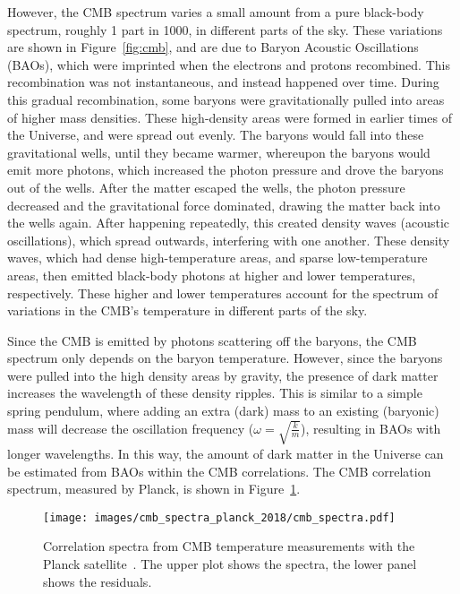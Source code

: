 However, the CMB spectrum varies a small amount from a pure black-body spectrum, roughly 1 part in 1000, in different parts of the sky.
These variations are shown in Figure~\ref{fig:cmb}, and are due to Baryon Acoustic Oscillations (BAOs), which were imprinted when the electrons and protons recombined.
This recombination was not instantaneous, and instead happened over time.
During this gradual recombination, some baryons were gravitationally pulled into areas of higher mass densities.
These high-density areas were formed in earlier times of the Universe, and were spread out evenly.
The baryons would fall into these gravitational wells, until they became warmer, whereupon the baryons would emit more photons, which increased the photon pressure and drove the baryons out of the wells.
After the matter escaped the wells, the photon pressure decreased and the gravitational force dominated, drawing the matter back into the wells again.
After happening repeatedly, this created density waves (acoustic oscillations), which spread outwards, interfering with one another.
These density waves, which had dense high-temperature areas, and sparse low-temperature areas, then emitted black-body photons at higher and lower temperatures, respectively.
These higher and lower temperatures account for the spectrum of variations in the CMB's temperature in different parts of the sky.

Since the CMB is emitted by photons scattering off the baryons, the CMB spectrum only depends on the baryon temperature.
However, since the baryons were pulled into the high density areas by gravity, the presence of dark matter increases the wavelength of these density ripples.
This is similar to a simple spring pendulum, where adding an extra (dark) mass to an existing (baryonic) mass will decrease the oscillation frequency ($\omega = \sqrt{\frac{k}{m}}$), resulting in BAOs with longer wavelengths.
In this way, the amount of dark matter in the Universe can be estimated from BAOs within the CMB correlations.
The CMB correlation spectrum, measured by Planck, is shown in Figure~\ref{fig:cmb_correlation_spectra}.

\begin{figure}[t]
  \centering
  \texttt{[image: images/cmb\_spectra\_planck\_2018/cmb\_spectra.pdf]}
  \caption[Cosmic Microwave Background Correlation Spectrum]{
    Correlation spectra from CMB temperature measurements with the Planck satellite~\cite{planck_dm_limit}.
    The upper plot shows the spectra, the lower panel shows the residuals.
  }
  \label{fig:cmb_correlation_spectra}
\end{figure}

